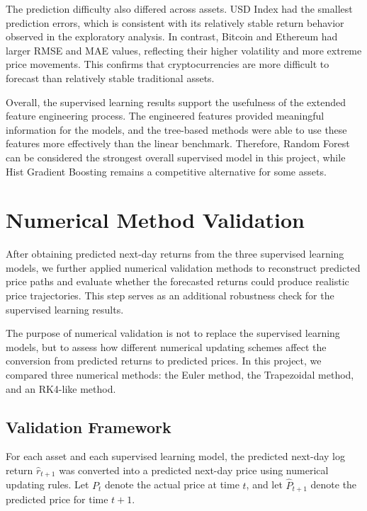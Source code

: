 \documentclass[12pt]{article}
\begin{document}
The prediction difficulty also differed across assets. USD Index had the smallest prediction errors, which is consistent with its relatively stable return behavior observed in the exploratory analysis. In contrast, Bitcoin and Ethereum had larger RMSE and MAE values, reflecting their higher volatility and more extreme price movements. This confirms that cryptocurrencies are more difficult to forecast than relatively stable traditional assets.

Overall, the supervised learning results support the usefulness of the extended feature engineering process. The engineered features provided meaningful information for the models, and the tree-based methods were able to use these features more effectively than the linear benchmark. Therefore, Random Forest can be considered the strongest overall supervised model in this project, while Hist Gradient Boosting remains a competitive alternative for some assets.


\section{Numerical Method Validation}

After obtaining predicted next-day returns from the three supervised learning models, we further applied numerical validation methods to reconstruct predicted price paths and evaluate whether the forecasted returns could produce realistic price trajectories. This step serves as an additional robustness check for the supervised learning results.

The purpose of numerical validation is not to replace the supervised learning models, but to assess how different numerical updating schemes affect the conversion from predicted returns to predicted prices. In this project, we compared three numerical methods: the Euler method, the Trapezoidal method, and an RK4-like method.

\subsection{Validation Framework}

For each asset and each supervised learning model, the predicted next-day log return $\hat{r}_{t+1}$ was converted into a predicted next-day price using numerical updating rules. Let $P_t$ denote the actual price at time $t$, and let $\hat{P}_{t+1}$ denote the predicted price for time $t+1$.
\end{document}
